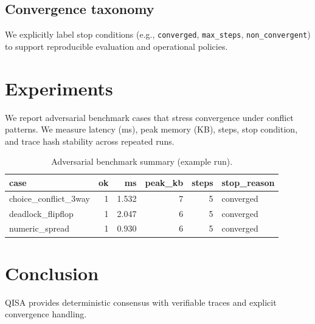 \documentclass[11pt]{article}
\begin{document}
\subsection{Convergence taxonomy}
We explicitly label stop conditions (e.g., \texttt{converged}, \texttt{max\_steps}, \texttt{non\_convergent}) to support reproducible evaluation and operational policies.

\section{Experiments}
We report adversarial benchmark cases that stress convergence under conflict patterns. We measure latency (ms), peak memory (KB), steps, stop condition, and trace hash stability across repeated runs.

\begin{table}[h]
\centering
\begin{tabular}{lrrrrl}
\toprule
case & ok & ms & peak\_kb & steps & stop\_reason \\
\midrule
choice\_conflict\_3way & 1 & 1.532 & 7 & 5 & converged \\
deadlock\_flipflop     & 1 & 2.047 & 6 & 5 & converged \\
numeric\_spread        & 1 & 0.930 & 6 & 5 & converged \\
\bottomrule
\end{tabular}
\caption{Adversarial benchmark summary (example run).}
\end{table}

\section{Conclusion}
QISA provides deterministic consensus with verifiable traces and explicit convergence handling.



\end{document}
